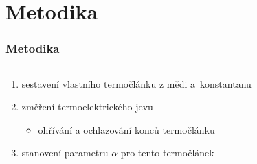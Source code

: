 \documentclass[smaller,aspectratio=1610,handout]{beamer}
\begin{document}
\section{Metodika}
\begin{frame}
	\frametitle{Metodika}
	\begin{columns}
		\begin{column}{0.5\textwidth}
			\begin{enumerate}
				\item sestavení vlastního termočlánku z mědi a~konstantanu
				\item změření termoelektrického jevu
					\begin{itemize}
						\item ohřívání a ochlazování konců termočlánku
					\end{itemize}
				\item stanovení parametru $\alpha$ pro tento termočlánek
			\end{enumerate}
		\end{column}
		\begin{column}{0.5\textwidth}
		\end{column}
	\end{columns}
\end{frame}
\end{document}
